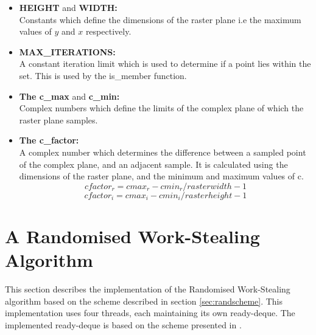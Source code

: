 \begin{itemize}
\item \textbf{HEIGHT} and \textbf{WIDTH:} \\
            Constants which define the dimensions of the raster plane i.e the maximum values of
            \(y\) and \(x\) respectively.
            
            
\item \textbf{MAX\_ITERATIONS:} \\
            A constant iteration limit which is used to determine if a point lies within the set.
            This is used by the is\_member function.
            
\item \textbf{The c\_max} and \textbf{c\_min:} \\
            Complex numbers which define the limits of the complex plane of
            which the raster plane samples.

\item \textbf{The c\_factor:} \\
            A complex number which determines the difference between a sampled point 
            of the complex plane, and an adjacent sample.
            It is calculated using the dimensions of the raster plane, and the 
            minimum and maximum values of c.
            \[ cfactor_r = cmax_r - cmin_r / rasterwidth - 1 \]
            \[ cfactor_i = cmax_i - cmin_i / rasterheight - 1 \]            
\end{itemize} 

\section{A Randomised Work-Stealing Algorithm}
\label{sec:randws}


This section describes the implementation of the Randomised Work-Stealing algorithm based on the scheme described in section \ref{sec:randscheme}.
This implementation uses four threads, each maintaining its own ready-deque. The implemented ready-deque is based on
the scheme presented in \cite{circdeque}.


